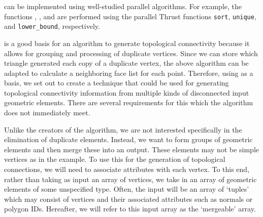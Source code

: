 \documentclass[review,journal]{vgtc}         %
\begin{document}
 can be implemented using well-studied parallel
algorithms.  For example, the functions ,
, and  are performed using the parallel
Thrust functions \texttt{sort}, \texttt{unique}, and \texttt{lower\_bound},
respectively.


 is a good basis for an algorithm to generate topological connectivity because it allows for
grouping and processing of duplicate vertices. Since we can store which triangle generated each copy of a duplicate vertex,
 the above algorithm can be adapted to calculate a neighboring face list for each point. Therefore, using  as a basis, we set out to create a technique that could be used for generating topological connectivity information 
from multiple kinds of disconnected input geometric elements. There are several requirements for this which the  algorithm
does not immediately meet.

Unlike the creators of the  algorithm, we are not interested specifically in the elimination of duplicate elements. Instead, we want
to form groups of geometric elements and then merge these into an output. These elements may not be simple vertices as in the  example.
To use this for the generation of topological connections, we will need to associate attributes with each vertex. To this end, rather than taking as input an array of vertices,
we take in an array of geometric elements of some unspecified type. Often, the input will be an array of `tuples' which may consist of
vertices and their associated attributes such as normals or polygon IDs. Hereafter, we will refer to this input array as the `mergeable' array.
\end{document}

